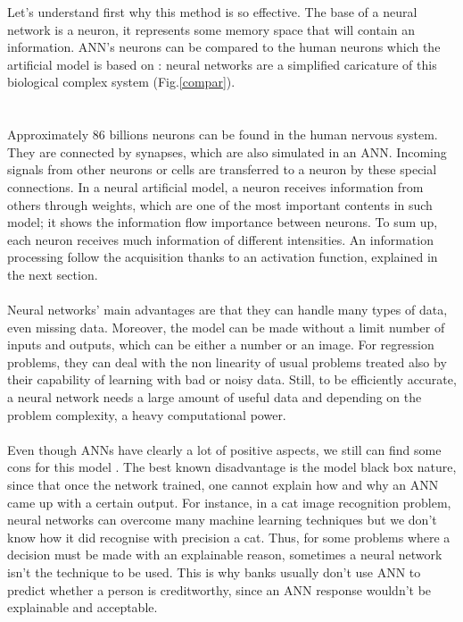 \documentclass[11pt, a4paper, English]{report}
\begin{document}
\begin{appendix}
 Let's understand first why this method is so effective.
The base of a neural network is a neuron, it represents some memory space that will contain an information. ANN's neurons can be compared to the human neurons which the artificial model is based on \cite{Kriesel}: neural networks are a  simplified caricature of this biological complex system (Fig.\ref{compar}).\\\\\\ Approximately 86 billions neurons can be found in the human nervous system. They are connected by synapses, which are also simulated in an ANN. Incoming signals from other neurons or cells are transferred to a neuron by  these special connections. In a neural artificial model, a neuron receives information from others through weights, which are one of the most important contents in such model; it shows the information flow importance between neurons. To sum up, each neuron receives much information of different intensities. An information processing follow the acquisition thanks to an activation function, explained in the next section.\\\\
Neural networks' main advantages are that they can handle many types of data, even missing data. Moreover, the model can be made without a limit number of inputs and outputs, which can be either a number or an image. For regression problems, they can deal with the non linearity of usual problems treated also by their capability of learning with bad or noisy data. Still, to be efficiently accurate, a neural network needs a large amount of useful data and depending on the problem complexity, a heavy computational power.\\\\
Even though ANNs have clearly a lot of positive aspects, we still can find some cons for this model \cite{AnnProcons}. The best known disadvantage is the model black box nature, since that once the network trained, one cannot explain how and why an ANN came up with a certain output. For instance, in a cat image recognition problem, neural networks can overcome many machine learning techniques but we don't know how it did recognise with precision a cat. Thus, for some problems where a decision must be made with an explainable reason, sometimes a neural network isn't the technique to be used. This is why banks usually don't use ANN to predict whether a person is creditworthy, since an ANN response wouldn't be explainable and acceptable.
\begin{figure}[h!]

\end{figure}
\end{appendix}
\end{document}
